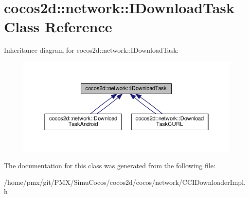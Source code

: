 \hypertarget{classcocos2d_1_1network_1_1IDownloadTask}{}\section{cocos2d\+:\+:network\+:\+:I\+Download\+Task Class Reference}
\label{classcocos2d_1_1network_1_1IDownloadTask}


Inheritance diagram for cocos2d\+:\+:network\+:\+:I\+Download\+Task\+:
\nopagebreak
\begin{figure}[H]
\begin{center}
\leavevmode
\includegraphics[width=350pt]{classcocos2d_1_1network_1_1IDownloadTask__inherit__graph}
\end{center}
\end{figure}


The documentation for this class was generated from the following file\+:\begin{DoxyCompactItemize}
\item 
/home/pmx/git/\+P\+M\+X/\+Simu\+Cocos/cocos2d/cocos/network/C\+C\+I\+Downloader\+Impl.\+h\end{DoxyCompactItemize}
